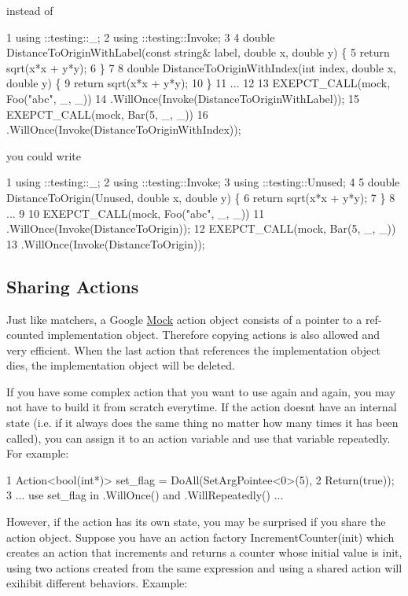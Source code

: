 instead of


\begin{DoxyCode}
1 using ::testing::\_;
2 using ::testing::Invoke;
3 
4 double DistanceToOriginWithLabel(const string& label, double x, double y) \{
5   return sqrt(x*x + y*y);
6 \}
7 
8 double DistanceToOriginWithIndex(int index, double x, double y) \{
9   return sqrt(x*x + y*y);
10 \}
11 ...
12 
13   EXEPCT\_CALL(mock, Foo("abc", \_, \_))
14       .WillOnce(Invoke(DistanceToOriginWithLabel));
15   EXEPCT\_CALL(mock, Bar(5, \_, \_))
16       .WillOnce(Invoke(DistanceToOriginWithIndex));
\end{DoxyCode}


you could write


\begin{DoxyCode}
1 using ::testing::\_;
2 using ::testing::Invoke;
3 using ::testing::Unused;
4 
5 double DistanceToOrigin(Unused, double x, double y) \{
6   return sqrt(x*x + y*y);
7 \}
8 ...
9 
10   EXEPCT\_CALL(mock, Foo("abc", \_, \_))
11       .WillOnce(Invoke(DistanceToOrigin));
12   EXEPCT\_CALL(mock, Bar(5, \_, \_))
13       .WillOnce(Invoke(DistanceToOrigin));
\end{DoxyCode}


\subsection*{Sharing Actions}

Just like matchers, a Google \hyperlink{classMock}{Mock} action object consists of a pointer to a ref-\/counted implementation object. Therefore copying actions is also allowed and very efficient. When the last action that references the implementation object dies, the implementation object will be deleted.

If you have some complex action that you want to use again and again, you may not have to build it from scratch everytime. If the action doesn\textquotesingle{}t have an internal state (i.\+e. if it always does the same thing no matter how many times it has been called), you can assign it to an action variable and use that variable repeatedly. For example\+:


\begin{DoxyCode}
1 Action<bool(int*)> set\_flag = DoAll(SetArgPointee<0>(5),
2                                     Return(true));
3 ... use set\_flag in .WillOnce() and .WillRepeatedly() ...
\end{DoxyCode}


However, if the action has its own state, you may be surprised if you share the action object. Suppose you have an action factory {\ttfamily Increment\+Counter(init)} which creates an action that increments and returns a counter whose initial value is {\ttfamily init}, using two actions created from the same expression and using a shared action will exihibit different behaviors. Example\+:


